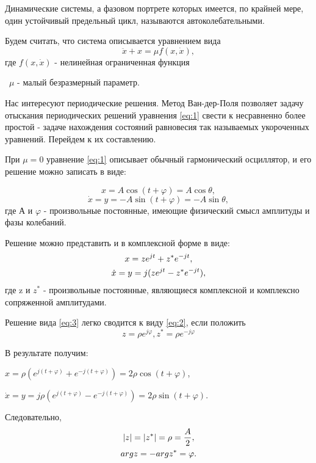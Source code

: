 Динамические системы, а фазовом портрете которых имеется, по крайней мере, один устойчивый предельный цикл, называются автоколебательными. 

Будем считать, что система описывается уравнением вида 
\begin{equation}
\label{eq:1}
\ddot{x}+x=\mu f(x,\dot{x}),
\end{equation}
где  $f(x,\dot{x})$ - нелинейная ограниченная функция 

~$\mu$ - малый безразмерный параметр.

Нас интересуют периодические решения. Метод Ван-дер-Поля позволяет задачу отыскания периодических решений уравнения \eqref{eq:1} свести к несравненно более простой - задаче нахождения состояний равновесия так называемых укороченных уравнений. Перейдем к их составлению.

При $\mu=0$ уравнение \eqref{eq:1} описывает обычный гармонический осциллятор, и его решение можно записать в виде:

$$x=A\cos(t+\varphi)=A\cos\theta,$$
\begin{equation}
\label{eq:2}
\dot{x}=y=-A\sin(t+\varphi)=-A\sin\theta,
\end{equation}
где А и $\varphi$ - произвольные постоянные, имеющие физический смысл амплитуды и фазы колебаний. 

Решение можно представить и в комплексной форме в виде: 
\begin{gather}
\label{eq:3}
x=ze^{jt}+z^*e^{-jt},\\\notag
\dot{x}=y=j(ze^{jt}-z^*e^{-jt}),
\end{gather}
где z и $z^*$ - произвольные постоянные, являющиеся комплексной и комплексно сопряженной амплитудами.  

Решение вида  \eqref{eq:3} легко сводится к виду \eqref{eq:2}, если положить $$z=\rho e^{j\varphi}, z^*=\rho e^{-j\varphi}$$

В результате получим:

\begin{center}
$x=\rho(e^{j(t+\varphi)}+e^{-j(t+\varphi)})=2\rho \cos(t+\varphi)$,

$\dot{x}=y=j\rho(e^{j(t+\varphi)}-e^{-j(t+\varphi)})=2\rho \sin(t+\varphi)$.
\end{center}
Следовательно, 
\begin{gather}
\label{eq:4}
|z|=|z^*|=\rho=\frac{A}{2},\\\notag
argz=-argz^*=\varphi.
\end{gather}

